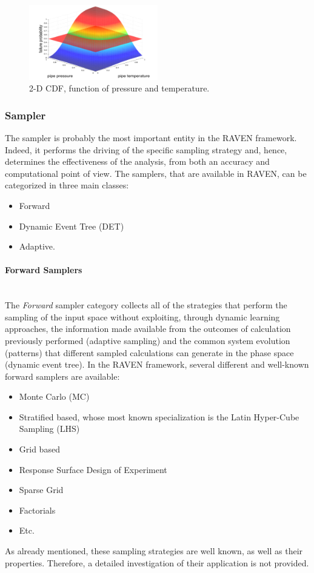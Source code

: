 \begin{figure}
  \centering
  \includegraphics[width=0.5\textwidth]  {pics/NDimensionalDistributionExample.png}
  \caption{2-D CDF, function of pressure and temperature.}
  \label{fig:NDDistributionExample}
\end{figure}

\subsubsection{Sampler}

The sampler is probably the most important entity in the RAVEN framework. Indeed, it performs the driving of the specific sampling strategy and, hence, determines the effectiveness of the analysis, from both an accuracy and computational point of view.  The samplers, that are available in RAVEN, can be categorized in three main classes:
\begin{itemize}
 \item Forward
 \item Dynamic Event Tree (DET)
 \item Adaptive.
\end{itemize}
\paragraph{Forward Samplers} ~\\ 
The \textit{Forward} sampler category collects all of the strategies that perform the sampling of the input space without exploiting, through dynamic learning approaches, the information made available from the outcomes of calculation previously performed (adaptive sampling) and the common system evolution (patterns) that different sampled calculations can generate in the phase space (dynamic event tree). 
In the RAVEN framework, several different and well-known forward samplers are available:
\begin{itemize}
\item Monte Carlo (MC)
\item Stratified based, whose most known specialization is the Latin Hyper-Cube Sampling (LHS)
\item Grid based
\item Response Surface Design of Experiment
\item Sparse Grid
\item Factorials
\item Etc.
\end{itemize}
As already mentioned, these sampling strategies are well known, as well as their properties. Therefore, a detailed investigation of their application is not provided.
